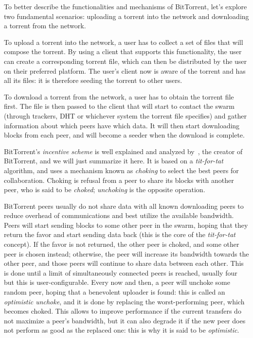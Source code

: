 \documentclass[mscthesis]{usiinfthesis}
\begin{document}
To better describe the functionalities and mechanisms of BitTorrent, let's explore two fundamental scenarios: uploading a torrent into the network and downloading a torrent from the network.

To upload a torrent into the network, a user has to collect a set of files that will compose the torrent. By using a client that supports this functionality, the user can create a corresponding torrent file, which can then be distributed by the user on their preferred platform. The user's client now is aware of the torrent and has all its files: it is therefore seeding the torrent to other users.

To download a torrent from the network, a user has to obtain the torrent file first. The file is then passed to the client that will start to contact the swarm (through trackers, DHT or whichever system the torrent file specifies) and gather information about which peers have which data. It will then start downloading blocks from each peer, and will become a seeder when the download is complete.

BitTorrent's \emph{incentive scheme} is well explained and analyzed by~\cite{cohen2003incentives}, the creator of BitTorrent, and we will just summarize it here. It is based on a \textit{tit-for-tat} algorithm, and uses a mechanism known as \emph{choking} to select the best peers for collaboration. Choking is refusal from a peer to share its blocks with another peer, who is said to be \textit{choked}; \textit{unchoking} is the opposite operation.

BitTorrent peers usually do not share data with all known downloading peers to reduce overhead of communications and best utilize the available bandwidth. Peers will start sending blocks to some other peer in the swarm, hoping that they return the favor and start sending data back (this is the core of the \textit{tit-for-tat} concept). If the favor is not returned, the other peer is choked, and some other peer is chosen instead; otherwise, the peer will increase its bandwidth towards the other peer, and those peers will continue to share data between each other. This is done until a limit of simultaneously connected peers is reached, usually four but this is user-configurable. Every now and then, a peer will unchoke some random peer, hoping that a benevolent uploader is found: this is called an \textit{optimistic unchoke}, and it is done by replacing the worst-performing peer, which becomes choked. This allows to improve performance if the current transfers do not maximize a peer's bandwidth, but it can also degrade it if the new peer does not perform as good as the replaced one: this is why it is said to be \textit{optimistic}.
\end{document}
